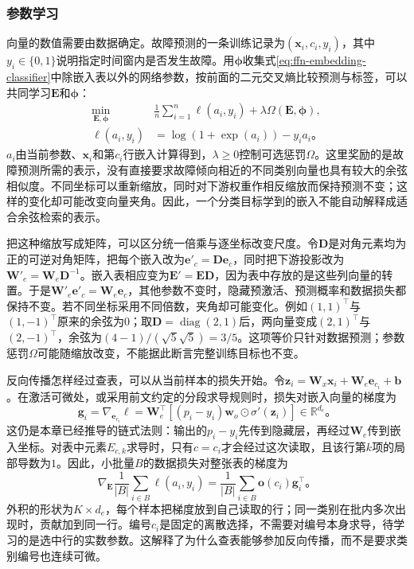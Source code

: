\FloatBarrier
\subsubsection{参数学习}
\label{sec:ffn-embedding-training}

向量的数值需要由数据确定。故障预测的一条训练记录为$(\bm{x}_i,c_i,y_i)$，其中$y_i\in\{0,1\}$说明指定时间窗内是否发生故障。用$\bm{\phi}$收集式\eqref{eq:ffn-embedding-classifier}中除嵌入表以外的网络参数，按前面的二元交叉熵比较预测与标签，可以共同学习$\bm{E}$和$\bm{\phi}$：
\begin{equation}
  \begin{aligned}
    \min_{\bm{E},\bm{\phi}}\quad &
    \frac{1}{n}\sum_{i=1}^{n}\ell(a_i,y_i)
    +\lambda\Omega(\bm{E},\bm{\phi}),\\
    \ell(a_i,y_i)&=\log(1+\exp(a_i))-y_i a_i\text{。}
  \end{aligned}
  \label{eq:ffn-embedding-objective}
\end{equation}
$a_i$由当前参数、$\bm{x}_i$和第$c_i$行嵌入计算得到，$\lambda\geq0$控制可选惩罚$\Omega$。这里奖励的是故障预测所需的表示，没有直接要求故障倾向相近的不同类别向量也具有较大的余弦相似度。不同坐标可以重新缩放，同时对下游权重作相反缩放而保持预测不变；这样的变化却可能改变向量夹角。因此，一个分类目标学到的嵌入不能自动解释成适合余弦检索的表示。

把这种缩放写成矩阵，可以区分统一倍乘与逐坐标改变尺度。令$\bm D$是对角元素均为正的可逆对角矩阵，把每个嵌入改为$\bm e'_c=\bm D\bm e_c$，同时把下游投影改为$\bm W'_e=\bm W_e\bm D^{-1}$。嵌入表相应变为$\bm E'=\bm E\bm D$，因为表中存放的是这些列向量的转置。于是$\bm W'_e\bm e'_c=\bm W_e\bm e_c$，其他参数不变时，隐藏预激活、预测概率和数据损失都保持不变。若不同坐标采用不同倍数，夹角却可能变化。例如$(1,1)^{\top}$与$(1,-1)^{\top}$原来的余弦为$0$；取$\bm D=\operatorname{diag}(2,1)$后，两向量变成$(2,1)^{\top}$与$(2,-1)^{\top}$，余弦为$(4-1)/(\sqrt5\sqrt5)=3/5$。这项等价只针对数据预测；参数惩罚$\Omega$可能随缩放改变，不能据此断言完整训练目标也不变。

反向传播怎样经过查表，可以从当前样本的损失开始。令$\bm{z}_i=\bm{W}_x\bm{x}_i+\bm{W}_e\bm{e}_{c_i}+\bm{b}$。在激活可微处，或采用前文约定的分段求导规则时，损失对嵌入向量的梯度为
\begin{equation}
  \bm{g}_i=\nabla_{\bm{e}_{c_i}}\ell
  =\bm{W}_e^{\top}\left[
    (p_i-y_i)\bm{w}_o\odot\sigma'(\bm{z}_i)
  \right]\in\mathbb{R}^{d_e}\text{。}
  \label{eq:ffn-embedding-vector-gradient}
\end{equation}
这仍是本章已经推导的链式法则：输出的$p_i-y_i$先传到隐藏层，再经过$\bm{W}_e$传到嵌入坐标。对表中元素$E_{c,k}$求导时，只有$c=c_i$才会经过这次读取，且该行第$k$项的局部导数为$1$。因此，小批量$B$的数据损失对整张表的梯度为
\begin{equation}
  \nabla_{\bm{E}}\frac{1}{|B|}\sum_{i\in B}\ell(a_i,y_i)
  =\frac{1}{|B|}\sum_{i\in B}\bm{o}(c_i)\bm{g}_i^{\top}\text{。}
  \label{eq:ffn-embedding-table-gradient}
\end{equation}
外积的形状为$K\times d_e$，每个样本把梯度放到自己读取的行；同一类别在批内多次出现时，贡献加到同一行。编号$c_i$是固定的离散选择，不需要对编号本身求导，待学习的是选中行的实数参数。这解释了为什么查表能够参加反向传播，而不是要求类别编号也连续可微。

